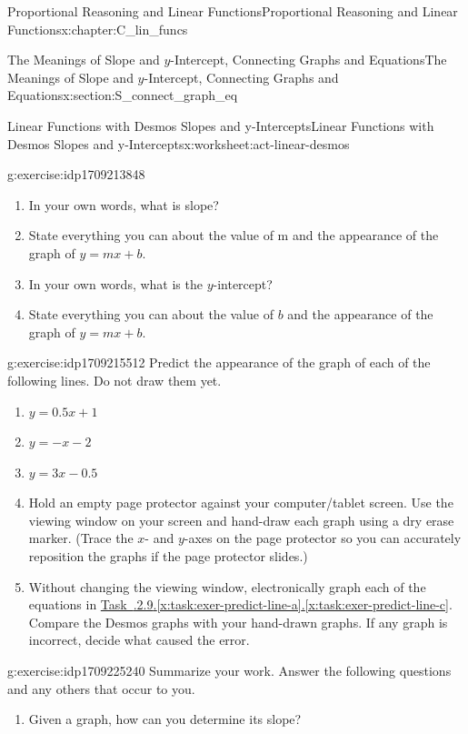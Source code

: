 \documentclass[oneside,10pt,]{book}
\newcommand{\xreffont}{\relax}
\numberwithin{equation}{chapter}
\begin{document}
\begin{chapterptx}{Proportional Reasoning and Linear Functions}{}{Proportional Reasoning and Linear Functions}{}{}{x:chapter:C_lin_funcs}
\begin{sectionptx}{The Meanings of Slope and \(y\)-Intercept, Connecting Graphs and Equations}{}{The Meanings of Slope and \(y\)-Intercept, Connecting Graphs and Equations}{}{}{x:section:S_connect_graph_eq}
\begin{worksheet-subsection}{Linear Functions with Desmos \textemdash{} Slopes and y-Intercepts}{}{Linear Functions with Desmos \textemdash{} Slopes and y-Intercepts}{}{}{x:worksheet:act-linear-desmos}
\begin{divisionexercise}{8}{}{}{g:exercise:idp1709213848}%
\begin{enumerate}[font=\bfseries,label=(\alph*),ref=\alph*]
\item{}In your own words, what is slope?%
\item{}State everything you can about the value of m and the appearance of the graph of \(y = mx + b\).%
\item{}In your own words, what is the \(y\)-intercept?%
\item{}State everything you can about the value of \(b\) and the appearance of the graph of \(y = mx + b\).%
\end{enumerate}
\end{divisionexercise}%
\begin{divisionexercise}{9}{}{}{g:exercise:idp1709215512}%
Predict the appearance of the graph of each of the following lines. Do not draw them yet.%
\begin{enumerate}[font=\bfseries,label=(\alph*),ref=\alph*]
\item\label{x:task:exer-predict-line-a}\(y = 0.5x + 1\)%
\item{}\(y = -x - 2\)%
\item\label{x:task:exer-predict-line-c}\(y = 3x - 0.5\)%
\item{}Hold an empty page protector against your computer\slash{}tablet screen. Use the viewing window on your screen and hand-draw each graph using a dry erase marker. (Trace the \(x\)- and \(y\)-axes on the page protector so you can accurately reposition the graphs if the page protector slides.)%
\item{}Without changing the viewing window, electronically graph each of the equations in \hyperref[x:task:exer-predict-line-a]{Task~{\xreffont 2.7.2.9}.{\xreffont\ref{x:task:exer-predict-line-a}}\textendash{}{\xreffont 2.7.2.9}.{\xreffont\ref{x:task:exer-predict-line-c}}}. Compare the Desmos graphs with your hand-drawn graphs. If any graph is incorrect, decide what caused the error.%
\end{enumerate}
\end{divisionexercise}%
\begin{divisionexercise}{10}{}{}{g:exercise:idp1709225240}%
Summarize your work. Answer the following questions and any others that occur to you.%
\begin{enumerate}[font=\bfseries,label=(\alph*),ref=\alph*]
\item{}Given a graph, how can you determine its slope?%

\end{enumerate}
\end{divisionexercise}
\end{worksheet-subsection}
\end{sectionptx}
\end{chapterptx}
\end{document}
